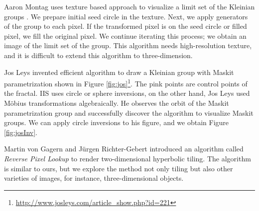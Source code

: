 Aaron Montag uses texture based approach to visualize a limit set of the
Kleinian groups \cite{Montag2014hyperbolicIFS}.
We prepare initial seed circle in the texture.
Next, we apply generators of the group to each pixel.
If the transformed pixel is on the seed circle or filled pixel, we fill the original pixel.
We continue iterating this process; we obtain an image of the limit set of
the group.
This algorithm needs high-resolution texture, and it is difficult to
extend this algorithm to three-dimension.

Jos Leys invented efficient algorithm to draw a Kleinian group with Maskit
parametrization shown in Figure
\ref{fig:jos}\footnote{\url{http://www.josleys.com/article_show.php?id=221}}. 
The pink points are control points of the fractal.
IIS uses circle or sphere inversions, on the other hand, Jos Leys used
M\"obius transformations algebraically.
He observes the orbit of the Maskit parametrization group and
successfully discover the algorithm to visualize Maskit groups.
We can apply circle inversions to his figure, and we obtain Figure \ref{fig:josInv}.

Martin von Gagern and J\"urgen Richter-Gebert introduced an algorithm
called \textit{Reverse Pixel Lookup}
\cite{journals/combinatorics/GagernR09} to render two-dimensional
hyperbolic tiling.
The algorithm is similar to ours, but
we explore the method not only tiling but also other varieties of
images, for instance, three-dimensional objects.

